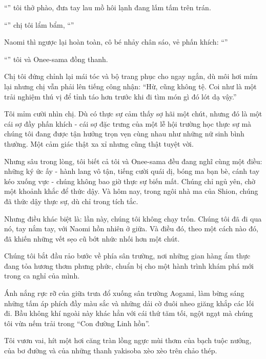 \documentclass[../main.tex]{subfiles}
\begin{document}
``'' tôi thở phào, đưa tay lau mồ hôi lạnh đang lấm tấm trên trán.

``'' chị tôi lẩm bẩm, ``''

Naomi thì ngược lại hoàn toàn, cô bé nhảy chân sáo, vẻ phấn khích: ``''

``'' tôi và Onee-sama đồng thanh.

Chị tôi đứng chỉnh lại mái tóc và bộ trang phục cho ngay ngắn, dù môi hơi mím lại nhưng chị vẫn phải lên tiếng công nhận: ``Hừ, cũng không tệ. Coi như là một trải nghiệm thú vị để tỉnh táo hơn trước khi đi tìm món gì đó lót dạ vậy.''

Tôi mỉm cười nhìn chị. Dù có thực sự cảm thấy sợ hãi một chút, nhưng đó là một cái sợ đầy phấn khích - cái sợ đặc trưng của một lễ hội trường học thực sự mà chúng tôi đang được tận hưởng trọn vẹn cùng nhau như những nữ sinh bình thường. Một cảm giác thật xa xỉ nhưng cũng thật tuyệt vời.

Nhưng sâu trong lòng, tôi biết cả tôi và Onee-sama đều đang nghĩ cùng một điều: những ký ức ấy - hành lang vô tận, tiếng cười quái dị, bóng ma bạn bè, cánh tay kéo xuống vực - chúng không bao giờ thực sự biến mất. Chúng chỉ ngủ yên, chờ một khoảnh khắc để thức dậy. Và hôm nay, trong ngôi nhà ma của Shion, chúng đã thức dậy thực sự, dù chỉ trong tích tắc.

Nhưng điều khác biệt là: lần này, chúng tôi không chạy trốn. Chúng tôi đã đi qua nó, tay nắm tay, với Naomi hồn nhiên ở giữa. Và điều đó, theo một cách nào đó, đã khiến những vết sẹo cũ bớt nhức nhối hơn một chút.

Chúng tôi bắt đầu rảo bước về phía sân trường, nơi những gian hàng ẩm thực đang tỏa hương thơm phưng phức, chuẩn bị cho một hành trình khám phá mới trong ca nghỉ của mình.


Ánh nắng rực rỡ của giữa trưa đổ xuống sân trường Aogami, làm bừng sáng những tấm áp phích đầy màu sắc và những dải cờ đuôi nheo giăng khắp các lối đi. Bầu không khí ngoài này khác hẳn với cái thứ tăm tối, ngột ngạt mà chúng tôi vừa nếm trải trong ``Con đường Linh hồn''.

Tôi vươn vai, hít một hơi căng tràn lồng ngực mùi thơm của bạch tuộc nướng, của bơ đường và của những thanh yakisoba xèo xèo trên chảo thép.
\end{document}
